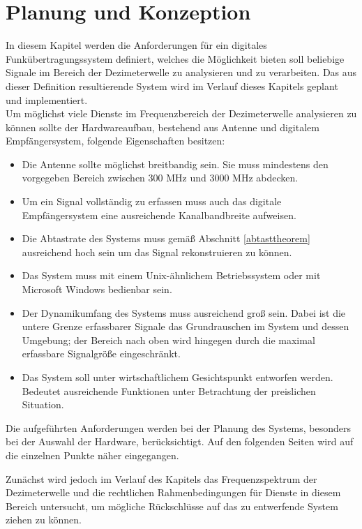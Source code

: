 \chapter{Planung und Konzeption}
In diesem Kapitel werden die Anforderungen für ein digitales Funkübertragungssystem definiert, welches die Möglichkeit bieten soll beliebige Signale im Bereich der Dezimeterwelle zu analysieren und zu verarbeiten. Das aus dieser Definition resultierende System wird im Verlauf dieses Kapitels geplant und implementiert.\\
Um möglichst viele Dienste im Frequenzbereich der Dezimeterwelle analysieren zu können sollte der Hardwareaufbau, bestehend aus Antenne und digitalem Empfängersystem, folgende Eigenschaften besitzen:
\begin{itemize}
	\item Die Antenne sollte möglichst breitbandig sein. Sie muss mindestens den vorgegeben Bereich zwischen 300 MHz und 3000 MHz abdecken.
	\item Um ein Signal vollständig zu erfassen muss auch das digitale Empfängersystem eine ausreichende Kanalbandbreite aufweisen.
	\item Die Abtastrate des Systems muss gemäß Abschnitt \ref{abtasttheorem} ausreichend hoch sein um das Signal rekonstruieren zu können.
	\item Das System muss mit einem Unix-ähnlichem Betriebssystem oder mit Microsoft Windows bedienbar sein.
	\item Der Dynamikumfang des Systems muss ausreichend groß sein. Dabei ist die untere Grenze erfassbarer Signale das Grundrauschen im System und dessen Umgebung; der Bereich nach oben wird hingegen durch die maximal erfassbare Signalgröße eingeschränkt. %
	\item Das System soll unter wirtschaftlichem Gesichtspunkt entworfen werden. Bedeutet ausreichende Funktionen unter Betrachtung der preislichen Situation.
\end{itemize}

Die aufgeführten Anforderungen werden bei der Planung des Systems, besonders bei der Auswahl der Hardware, berücksichtigt. Auf den folgenden Seiten wird auf die einzelnen Punkte näher eingegangen. 

Zunächst wird jedoch im Verlauf des Kapitels das Frequenzspektrum der Dezimeterwelle und die rechtlichen Rahmenbedingungen für Dienste in diesem Bereich untersucht, um mögliche Rückschlüsse auf das zu entwerfende System ziehen zu können.


